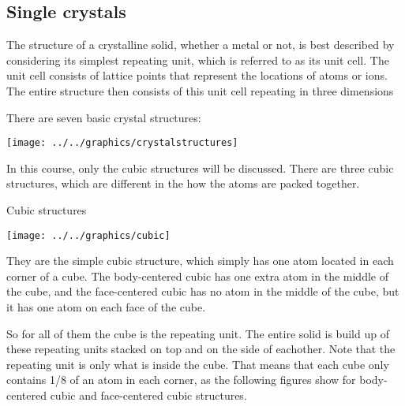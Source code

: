 \documentclass[ignorenonframetext]{beamer}
\begin{document}
\subsection{Single crystals}


The structure of a crystalline solid, whether a metal or not, is best described by considering its simplest repeating unit, which is referred to as its unit cell.
The unit cell consists of lattice points that represent the locations of atoms or ions.
The entire structure then consists of this unit cell repeating in three dimensions\smallskip
\\
\begin{frame}
There are seven basic crystal structures:

\begin{center} \texttt{[image: ../../graphics/crystalstructures]} \end{center}
\end{frame}

In this course, only the cubic structures will be discussed. There are three cubic structures, which are different in the how the atoms are packed together.

\begin{frame}{Cubic structures}
\begin{center} \texttt{[image: ../../graphics/cubic]} \end{center}
\end{frame}

They are the simple cubic structure, which simply has one atom located in each corner of a cube. The body-centered cubic has one extra atom in the middle of the cube, and the face-centered cubic has no atom in the middle of the cube, but it has one atom on each face of the cube.

So for all of them the cube is the repeating unit. The entire solid is build up of these repeating units stacked on top and on the side of eachother. Note that the repeating unit is only what is inside the cube. That means that each cube only contains 1/8 of an atom in each corner, as the following figures show for body-centered cubic and face-centered cubic structures.

\begin{frame}
\begin{figure}[h]
\centering
{}

\end{figure}
\end{frame}
\end{document}
